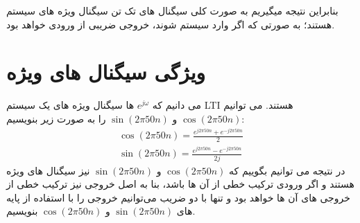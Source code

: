 \documentclass[fleqn]{article}
\theoremstyle{definition}
\begin{document}
بنابراین نتیجه میگیریم به صورت کلی سیگنال های تک تن سیگنال ویژه های سیستم هستند؛ به صورتی که اگر وارد سیستم شوند، خروجی ضریبی از ورودی خواهد بود.

\section{ویژگی سیگنال های ویژه}
می دانیم که $e^{j\omega}$ ها سیگنال ویژه های یک سیستم LTI هستند. می توانیم $\cos(2\pi 50 n)$ و $\sin(2\pi 50 n)$ را به صورت زیر بنویسیم:
\begin{gather*}
    \cos(2\pi 50 n)=\frac{e^{j2\pi 50 n}+e^{-j2\pi 50 n}}{2} \\
    \sin(2\pi 50 n)=\frac{e^{j2\pi 50 n}-e^{-j2\pi 50 n}}{2j}
\end{gather*}
در نتیجه می توانیم بگوییم که $\cos(2\pi 50 n)$ و $\sin(2\pi 50 n)$ نیز سیگنال های ویژه هستند و اگر ورودی ترکیب خطی از آن ها باشد، بنا به اصل \textit{} خروجی نیز ترکیب خطی از خروجی های آن ها خواهد بود و تنها با دو ضریب می‌توانیم خروجی را با استفاده از پایه های $\sin(2\pi 50 n)$ و $\cos(2\pi 50 n)$ بنویسیم.\\
\end{document}

